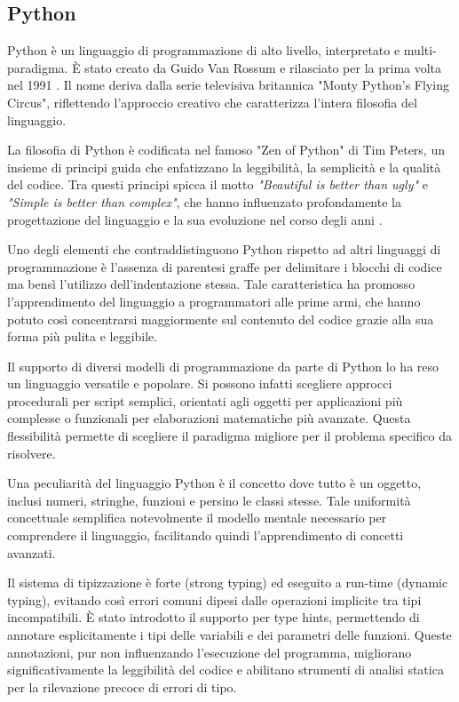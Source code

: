 \subsection{Python}

Python è un linguaggio di programmazione di alto livello, interpretato e multi-paradigma. È stato creato da Guido Van Rossum e rilasciato per la prima volta nel 1991 \citep{van_rossum_1995}. Il nome deriva dalla serie televisiva britannica "Monty Python's Flying Circus", riflettendo l'approccio creativo che caratterizza l'intera filosofia del linguaggio.

La filosofia di Python è codificata nel famoso "Zen of Python" di Tim Peters, un insieme di principi guida che enfatizzano la leggibilità, la semplicità e la qualità del codice. Tra questi principi spicca il motto \textit{"Beautiful is better than ugly"} e \textit{"Simple is better than complex"}, che hanno influenzato profondamente la progettazione del linguaggio e la sua evoluzione nel corso degli anni \citep{peters_2004}.

Uno degli elementi che contraddistinguono Python rispetto ad altri linguaggi di programmazione è l'assenza di parentesi graffe per delimitare i blocchi di codice ma bensì l'utilizzo dell'indentazione stessa. Tale caratteristica ha promosso l'apprendimento del linguaggio a programmatori alle prime armi, che hanno potuto così concentrarsi maggiormente sul contenuto del codice grazie alla sua forma più pulita e leggibile.

Il supporto di diversi modelli di programmazione da parte di Python lo ha reso un linguaggio versatile e popolare. Si possono infatti scegliere approcci procedurali per script semplici, orientati agli oggetti per applicazioni più complesse o funzionali per elaborazioni matematiche più avanzate. Questa flessibilità permette di scegliere il paradigma migliore per il problema specifico da risolvere.

Una peculiarità del linguaggio Python è il concetto dove tutto è un oggetto, inclusi numeri, stringhe, funzioni e persino le classi stesse. Tale uniformità concettuale semplifica notevolmente il modello mentale necessario per comprendere il linguaggio, facilitando quindi l'apprendimento di concetti avanzati.

Il sistema di tipizzazione è forte (strong typing) ed eseguito a run-time (dynamic typing), evitando così errori comuni dipesi dalle operazioni implicite tra tipi incompatibili. È stato introdotto il supporto per type hints, permettendo di annotare esplicitamente i tipi delle variabili e dei parametri delle funzioni. Queste annotazioni, pur non influenzando l'esecuzione del programma, migliorano significativamente la leggibilità del codice e abilitano strumenti di analisi statica per la rilevazione precoce di errori di tipo.

